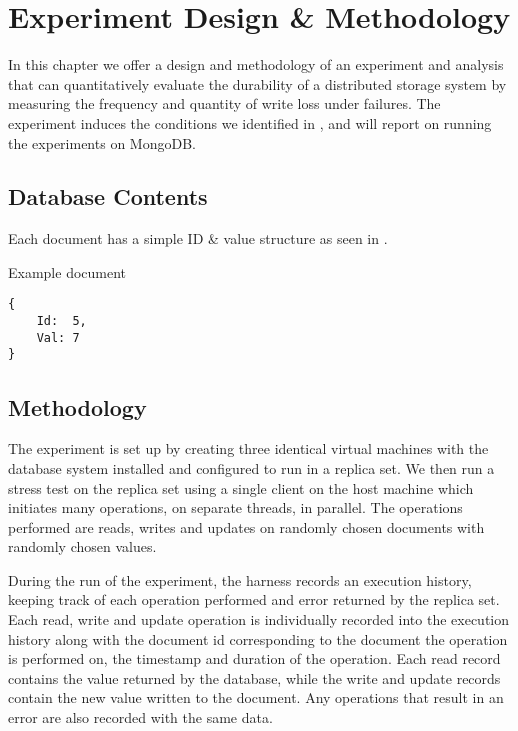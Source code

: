 \chapter{Experiment Design \& Methodology} \label{chap:experiments}

In this chapter we offer a design and methodology of an experiment and analysis that can quantitatively evaluate the durability of a distributed storage system by measuring the frequency and quantity of write loss under failures. The experiment induces the conditions we identified in , and  will report on running the experiments on MongoDB.

\section{Database Contents}

Each document has a simple ID \& value structure as seen in .

\begin{algorithm}
\caption{Example document}
\begin{verbatim}
{
    Id:  5,
    Val: 7
}
\end{verbatim}
\label{alg:doc}
\end{algorithm}

\section{Methodology}

The experiment is set up by creating three identical virtual machines with the database system installed and configured to run in a replica set. We then run a stress test on the replica set using a single client on the host machine which initiates many operations, on separate threads, in parallel. The operations performed are reads, writes and updates on randomly chosen documents with randomly chosen values.

During the run of the experiment, the harness records an execution history, keeping track of each operation performed and error returned by the replica set. Each read, write and update operation is individually recorded into the execution history along with the document id corresponding to the document the operation is performed on,
the timestamp and duration of the operation. Each read record contains the value returned by the database, while the write and update records contain the new value written to the document. Any operations that result in an error are also recorded with the same data.

